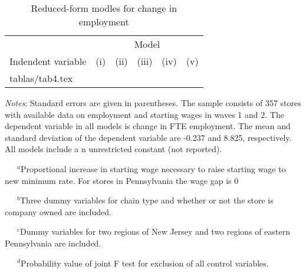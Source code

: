 \documentclass{article}
\makeatletter
\newcommand\primitiveinput[1]
{\@@input #1 }
\makeatother
\begin{document}
\begin{table}[H]
	\centering
	\label{tab:Table2}
		\begin{threeparttable}
			\caption{Reduced-form modles for change in employment}
			\begin{tabular}{@{}l*{5}{c}@{}}
				\toprule
				& \multicolumn{5}{c}{Model}								\\ \cmidrule(l){2-6}
				Indendent variable & (i) & (ii) & (iii) & (iv) & (v) 	\\ \midrule
				\primitiveinput{tablas/tab4.tex}
				\bottomrule
			\end{tabular}
			\begin{tablenotes}
				\setlength{}
				\footnotesize
				\item \textit{Notes}: Standard errors are given in parentheses.
				The sample consists of 357 stores with available data on employment and starting wages in waves 1 and 2.
				The dependent variable in all models is change in FTE employment. The mean and standard deviation of
				the dependent variable are -0.237 and 8.825, respectively. All models include a n unrestricted constant (not reported).
				\item ~~~$^{a}$Proportional increase in starting wage necessary to raise starting wage to new minimum rate. For stores in Pennsylvania the wage gap is 0
				\item ~~~$^{b}$Three dummy variables for chain type and whether or not the store is company owned are included.
				\item ~~~$^{c}$Dummy variables for two regions of New Jersey and two regions of eastern Pennsylvania are included.
				\item ~~~$^{d}$Probability value of joint F test for exclusion of all control variables.
			\end{tablenotes}
		\end{threeparttable}
\end{table}
\end{document}
